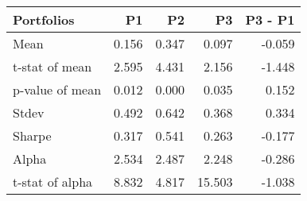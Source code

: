 \begin{tabular}{lrrrr}
\toprule
Portfolios & P1 & P2 & P3 & P3 - P1 \\
\midrule
Mean & 0.156 & 0.347 & 0.097 & -0.059 \\
t-stat of mean & 2.595 & 4.431 & 2.156 & -1.448 \\
p-value of mean & 0.012 & 0.000 & 0.035 & 0.152 \\
Stdev & 0.492 & 0.642 & 0.368 & 0.334 \\
Sharpe & 0.317 & 0.541 & 0.263 & -0.177 \\
Alpha & 2.534 & 2.487 & 2.248 & -0.286 \\
t-stat of alpha & 8.832 & 4.817 & 15.503 & -1.038 \\
\bottomrule
\end{tabular}
